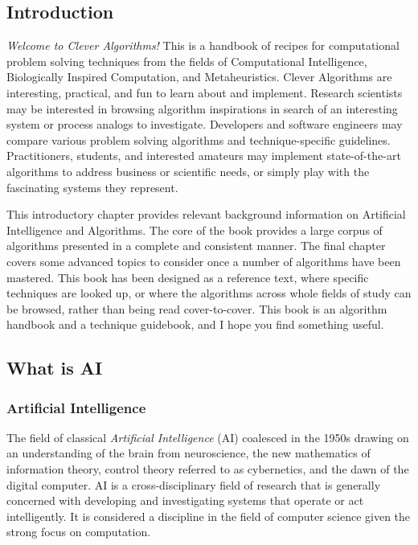 


\begin{bibunit}

\chapter{Introduction}
\label{chap:intro}
\emph{Welcome to Clever Algorithms!} This is a handbook of recipes for computational problem solving techniques from the fields of Computational Intelligence, Biologically Inspired Computation, and Metaheuristics. 
Clever Algorithms are interesting, practical, and fun to learn about and implement.
Research scientists may be interested in browsing algorithm inspirations in search of an interesting system or process analogs to investigate. Developers and software engineers may compare various problem solving algorithms and technique-specific guidelines. Practitioners, students, and interested amateurs may implement state-of-the-art algorithms to address business or scientific needs, or simply play with the fascinating systems they represent.

This introductory chapter provides relevant background information on Artificial Intelligence and Algorithms. The core of the book provides a large corpus of algorithms presented in a complete and consistent manner. The final chapter covers some advanced topics to consider once a number of algorithms have been mastered. This book has been designed as a reference text, where specific techniques are looked up, or where the algorithms across whole fields of study can be browsed, rather than being read cover-to-cover. This book is an algorithm handbook and a technique guidebook, and I hope you find something useful.


% 
% 
\section{What is AI}
\label{intro:sec:what_is_ai}
% 
% 
\subsection{Artificial Intelligence}
\label{sec:artificial_intelligence}
The field of classical \emph{Artificial Intelligence} (AI) coalesced in the 1950s drawing on an understanding of the brain from neuroscience, the new mathematics of information theory, control theory referred to as cybernetics, and the dawn of the digital computer. AI is a cross-disciplinary field of research that is generally concerned with developing and investigating systems that operate or act intelligently. It is considered a discipline in the field of computer science given the strong focus on computation.


\end{bibunit}

